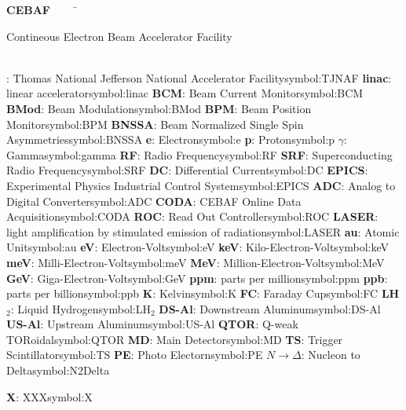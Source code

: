 \begin{tabbing}
\textbf{CEBAF}~~~~~\=\parbox{4.87in}{Contineous Electron Beam Accelerator Facility\dotfill \pageref{symbol:CEBAF}}\\
\addsymbol {}: {Thomas National Jefferson National Accelerator Facility}{symbol:TJNAF}
\addsymbol \textbf{linac}: {linear accelerator}{symbol:linac}
\addsymbol \textbf{BCM}: {Beam Current Monitor}{symbol:BCM}
\addsymbol \textbf{BMod}: {Beam Modulation}{symbol:BMod}
\addsymbol \textbf{BPM}: {Beam Position Monitor}{symbol:BPM}
\addsymbol \textbf{BNSSA}: {Beam Normalized Single Spin Asymmetries}{symbol:BNSSA}
\addsymbol \textbf{e}: {Electron}{symbol:e}
\addsymbol \textbf{p}: {Proton}{symbol:p}
\addsymbol \textbf{$\gamma$}: {Gamma}{symbol:gamma}
\addsymbol \textbf{RF}: {Radio Frequency}{symbol:RF}
\addsymbol \textbf{SRF}: {Superconducting Radio Frequency}{symbol:SRF}
\addsymbol \textbf{DC}: {Differential Current}{symbol:DC}
\addsymbol \textbf{EPICS}: {Experimental Physics Industrial Control System}{symbol:EPICS}
\addsymbol \textbf{ADC}: {Analog to Digital Converter}{symbol:ADC}
\addsymbol \textbf{CODA}: {CEBAF Online Data Acquisition}{symbol:CODA}
\addsymbol \textbf{ROC}: {Read Out Controller}{symbol:ROC}
\addsymbol \textbf{LASER}: {light amplification by stimulated emission of radiation}{symbol:LASER}
\addsymbol \textbf{au}: {Atomic Unit}{symbol:au}
\addsymbol \textbf{eV}: {Electron-Volt}{symbol:eV}
\addsymbol \textbf{keV}: {Kilo-Electron-Volt}{symbol:keV}
\addsymbol \textbf{meV}: {Milli-Electron-Volt}{symbol:meV}
\addsymbol \textbf{MeV}: {Million-Electron-Volt}{symbol:MeV}
\addsymbol \textbf{GeV}: {Giga-Electron-Volt}{symbol:GeV}
\addsymbol \textbf{ppm}: {parts per million}{symbol:ppm}
\addsymbol \textbf{ppb}: {parts per billion}{symbol:ppb}
\addsymbol \textbf{K}: {Kelvin}{symbol:K}
\addsymbol \textbf{FC}: {Faraday Cup}{symbol:FC}
\addsymbol \textbf{LH$_2$}: {Liquid Hydrogen}{symbol:LH$_2$}
\addsymbol \textbf{DS-Al}: {Downstream Aluminum}{symbol:DS-Al}
\addsymbol \textbf{US-Al}: {Upstream Aluminum}{symbol:US-Al}
\addsymbol \textbf{QTOR}: {Q-weak TORoidal}{symbol:QTOR}
\addsymbol \textbf{MD}: {Main Detector}{symbol:MD}
\addsymbol \textbf{TS}: {Trigger Scintillator}{symbol:TS}
\addsymbol \textbf{PE}: {Photo Electorn}{symbol:PE}
\addsymbol \textbf{$N \rightarrow \Delta$}: {Nucleon to Delta}{symbol:N2Delta}


\addsymbol \textbf{X}: {XXX}{symbol:X}

\end{tabbing}